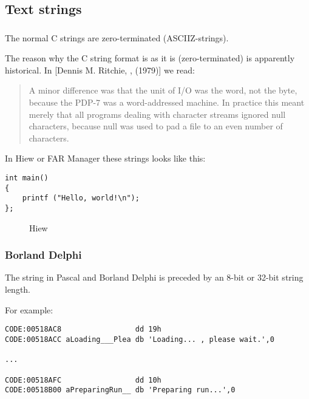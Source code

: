 \subsection{Text strings}

\subsubsection{\CCpp}

\label{C_strings}
The normal C strings are zero-terminated (\ac{ASCIIZ}-strings).

The reason why the C string format is as it is (zero-terminated) is apparently historical.
In [Dennis M. Ritchie, , (1979)]
we read:

\begin{framed}
\begin{quotation}
A minor difference was that the unit of I/O was the word, not the byte, because the PDP-7 was a word-addressed
machine. In practice this meant merely that all programs dealing with character streams ignored null
characters, because null was used to pad a file to an even number of characters.
\end{quotation}
\end{framed}


In Hiew or FAR Manager these strings looks like this:

\begin{lstlisting}
int main()
{
	printf ("Hello, world!\n");
};
\end{lstlisting}

\begin{figure}[H]
\centering
{}
\caption{Hiew}
\end{figure}


\subsubsection{Borland Delphi}

The string in Pascal and Borland Delphi is preceded by an 8-bit or 32-bit string length.

For example:

\begin{lstlisting}[caption=Delphi]
CODE:00518AC8                 dd 19h
CODE:00518ACC aLoading___Plea db 'Loading... , please wait.',0

...

CODE:00518AFC                 dd 10h
CODE:00518B00 aPreparingRun__ db 'Preparing run...',0
\end{lstlisting}

